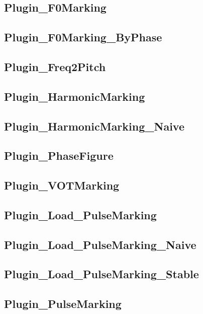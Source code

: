 \subsection{Plugin\_F0Marking}

\subsection{Plugin\_F0Marking\_ByPhase}

\subsection{Plugin\_Freq2Pitch}

\subsection{Plugin\_HarmonicMarking}

\subsection{Plugin\_HarmonicMarking\_Naive}

\subsection{Plugin\_PhaseFigure}

\subsection{Plugin\_VOTMarking}

\subsection{Plugin\_Load\_PulseMarking}

\subsection{Plugin\_Load\_PulseMarking\_Naive}

\subsection{Plugin\_Load\_PulseMarking\_Stable}

\subsection{Plugin\_PulseMarking}

